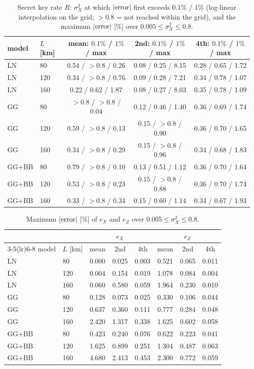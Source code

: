 \documentclass[11pt,a4paper]{article}
\begin{document}
\begin{table}[htbp]\centering\small
\caption{Secret key rate $R$: $\sigma_X^2$ at which $|{\rm error}|$ first exceeds $0.1\%$ / $1\%$ (log-linear interpolation on the grid; $>0.8$ = not reached within the grid), and the maximum $|{\rm error}|$ [\%] over $0.005\le\sigma_X^2\le0.8$.}
\label{tab:thr}
\begin{tabular}{llccc}\toprule
model & $L$ [km] & mean: $0.1\%$ / $1\%$ / max & 2nd: $0.1\%$ / $1\%$ / max & 4th: $0.1\%$ / $1\%$ / max\\\midrule
LN & 80 & 0.54 / $>0.8$ / 0.26 & 0.08 / 0.25 / 8.15 & 0.28 / 0.65 / 1.72 \\
LN & 120 & 0.34 / $>0.8$ / 0.76 & 0.09 / 0.28 / 7.21 & 0.34 / 0.78 / 1.07 \\
LN & 160 & 0.22 / 0.62 / 1.87 & 0.08 / 0.27 / 8.03 & 0.35 / 0.78 / 1.09 \\
\midrule
GG & 80 & $>0.8$ / $>0.8$ / 0.04 & 0.12 / 0.46 / 1.40 & 0.36 / 0.69 / 1.74 \\
GG & 120 & 0.59 / $>0.8$ / 0.13 & 0.15 / $>0.8$ / 0.90 & 0.36 / 0.70 / 1.65 \\
GG & 160 & 0.34 / $>0.8$ / 0.29 & 0.15 / $>0.8$ / 0.96 & 0.34 / 0.68 / 1.83 \\
\midrule
GG+BB & 80 & 0.79 / $>0.8$ / 0.10 & 0.13 / 0.51 / 1.12 & 0.36 / 0.70 / 1.64 \\
GG+BB & 120 & 0.53 / $>0.8$ / 0.23 & 0.15 / $>0.8$ / 0.88 & 0.36 / 0.70 / 1.74 \\
GG+BB & 160 & 0.33 / $>0.8$ / 0.34 & 0.15 / 0.60 / 1.14 & 0.34 / 0.67 / 1.93 \\
\bottomrule\end{tabular}\end{table}

\begin{table}[htbp]\centering\small
\caption{Maximum $|{\rm error}|$ [\%] of $e_X$ and $e_Z$ over $0.005\le\sigma_X^2\le0.8$.}
\label{tab:thr2}
\begin{tabular}{llcccccc}\toprule
 & & \multicolumn{3}{c}{$e_X$} & \multicolumn{3}{c}{$e_Z$}\\\cmidrule(lr){3-5}\cmidrule(lr){6-8}
model & $L$ [km] & mean & 2nd & 4th & mean & 2nd & 4th\\\midrule
LN & 80 & 0.000 & 0.025 & 0.003 & 0.521 & 0.065 & 0.011 \\
LN & 120 & 0.004 & 0.154 & 0.019 & 1.078 & 0.084 & 0.004 \\
LN & 160 & 0.060 & 0.580 & 0.059 & 1.964 & 0.230 & 0.010 \\
\midrule
GG & 80 & 0.128 & 0.073 & 0.025 & 0.330 & 0.106 & 0.044 \\
GG & 120 & 0.637 & 0.360 & 0.111 & 0.777 & 0.284 & 0.048 \\
GG & 160 & 2.420 & 1.317 & 0.338 & 1.625 & 0.602 & 0.058 \\
\midrule
GG+BB & 80 & 0.423 & 0.240 & 0.076 & 0.622 & 0.223 & 0.041 \\
GG+BB & 120 & 1.625 & 0.899 & 0.251 & 1.304 & 0.487 & 0.063 \\
GG+BB & 160 & 4.680 & 2.413 & 0.453 & 2.300 & 0.772 & 0.059 \\
\bottomrule\end{tabular}\end{table}
\end{document}

